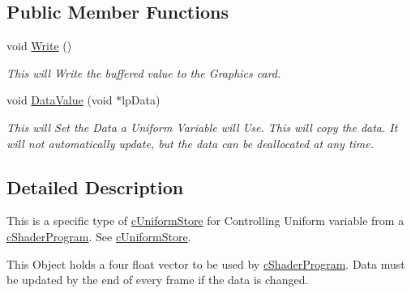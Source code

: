 \subsection*{Public Member Functions}
\begin{DoxyCompactItemize}
\item 
\hypertarget{classc_uniform_vector4_a784f7b6fc64f869a2dc0e00c7098bba8}{
void \hyperlink{classc_uniform_vector4_a784f7b6fc64f869a2dc0e00c7098bba8}{Write} ()}
\label{classc_uniform_vector4_a784f7b6fc64f869a2dc0e00c7098bba8}

\begin{DoxyCompactList}\small\item\em This will Write the buffered value to the Graphics card. \end{DoxyCompactList}\item 
\hypertarget{classc_uniform_vector4_a2ede3bce3179f3281d50a51dc2979bd6}{
void \hyperlink{classc_uniform_vector4_a2ede3bce3179f3281d50a51dc2979bd6}{DataValue} (void $\ast$lpData)}
\label{classc_uniform_vector4_a2ede3bce3179f3281d50a51dc2979bd6}

\begin{DoxyCompactList}\small\item\em This will Set the Data a Uniform Variable will Use. This will copy the data. It will not automatically update, but the data can be deallocated at any time. \end{DoxyCompactList}\end{DoxyCompactItemize}


\subsection{Detailed Description}
This is a specific type of \hyperlink{classc_uniform_store}{cUniformStore} for Controlling Uniform variable from a \hyperlink{classc_shader_program}{cShaderProgram}. See \hyperlink{classc_uniform_store}{cUniformStore}. 

This Object holds a four float vector to be used by \hyperlink{classc_shader_program}{cShaderProgram}. Data must be updated by the end of every frame if the data is changed. 